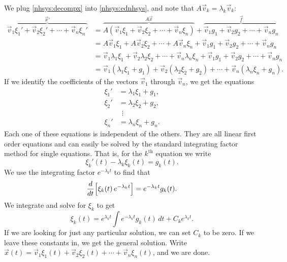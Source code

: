 We plug \eqref{nhsys:decompx} into \eqref{nhsys:ednhsys}, and note that
$A \vec{v}_k = \lambda_k \vec{v}_k$:
\begin{equation*}
\begin{split}
\overbrace{
\vec{v}_1 \xi_1' + 
\vec{v}_2 \xi_2' + \cdots +
\vec{v}_n \xi_n'
}^{{\vec{x}}'}
& =
\overbrace{
A \left( \vec{v}_1 \xi_1 + 
\vec{v}_2 \xi_2 + \cdots +
\vec{v}_n \xi_n \right)
}^{A\vec{x}}
+
\overbrace{
\vec{v}_1 g_1 + 
\vec{v}_2 g_2 + \cdots +
\vec{v}_n g_n
}^{\vec{f}}
\\
& = 
A \vec{v}_1 \xi_1 + 
A \vec{v}_2 \xi_2 + \cdots +
A \vec{v}_n \xi_n
+
\vec{v}_1 g_1 + 
\vec{v}_2 g_2 + \cdots +
\vec{v}_n g_n
\\
& =
\vec{v}_1 \lambda_1 \xi_1 + 
\vec{v}_2 \lambda_2 \xi_2 + \cdots +
\vec{v}_n \lambda_n \xi_n
+
\vec{v}_1 g_1 + 
\vec{v}_2 g_2 + \cdots +
\vec{v}_n g_n
\\
& =
\vec{v}_1 ( \lambda_1 \xi_1 + g_1 ) +
\vec{v}_2 ( \lambda_2 \xi_2 + g_2 ) + \cdots + 
\vec{v}_n ( \lambda_n \xi_n + g_n ) .
\end{split}
\end{equation*}
If we identify the coefficients of the vectors $\vec{v}_1$ through
$\vec{v}_n$, we get the
equations
\begin{align*}
\xi_1' & = \lambda_1 \xi_1 + g_1 , \\
\xi_2' & = \lambda_2 \xi_2 + g_2 , \\
& ~~ \vdots \\
\xi_n' & = \lambda_n \xi_n + g_n .
\end{align*}
Each one of these equations is independent of the others.  They are all
linear first order equations and can easily be solved by the standard
integrating factor method for single equations.
That is, for the $k^{\text{th}}$
equation we write
\begin{equation*}
\xi_k'(t) - \lambda_k \xi_k(t) = g_k(t) .
\end{equation*}
We use the integrating factor $e^{-\lambda_k t}$ to find that
\begin{equation*}
\frac{d}{dt}\Bigl[ \xi_k(t) \, e^{-\lambda_k t} \Bigr] = 
e^{-\lambda_k t} g_k(t) .
\end{equation*}
We integrate and solve for $\xi_k$ to get
\begin{equation*}
\xi_k(t) =  e^{\lambda_k t} 
\int e^{-\lambda_k t} g_k(t) \,dt + C_k e^{\lambda_k t} .
\end{equation*}
If we are looking for just any particular solution, we can set
$C_k$ to be zero.  If we leave these constants in, we get the
general solution.  Write
$\vec{x}(t) =
\vec{v}_1 \xi_1(t) + 
\vec{v}_2 \xi_2(t) + \cdots +
\vec{v}_n \xi_n(t)$, and we are done.

